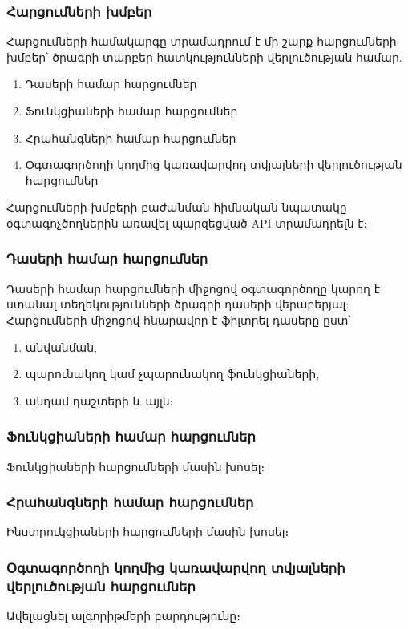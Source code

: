 {
    \subsubsection{Հարցումների խմբեր}\label{subsubsec:queryGroups}
    Հարցումների համակարգը տրամադրում է մի շարք հարցումների խմբեր՝ ծրագրի տարբեր հատկությունների վերլուծության համար.
    \begin{enumerate}
        \item Դասերի համար հարցումներ
        \item Ֆունկցիաների համար հարցումներ
        \item Հրահանգների համար հարցումներ
        \item Օգտագործողի կողմից կառավարվող տվյալների վերլուծության հարցումներ
    \end{enumerate}

    Հարցումների խմբերի բաժանման հիմնական նպատակը օգտագոչծողներին առավել պարզեցված API տրամադրելն է։

    \subsubsection*{Դասերի համար հարցումներ}\label{subsubsec:classes}
    Դասերի համար հարցումների միջոցով օգտագործողը կարող է ստանալ տեղեկությունների ծրագրի դասերի վերաբերյալ:
    Հարցումների միջոցով հնարավոր է ֆիլտրել դասերը ըստ՝
    \begin{enumerate}
        \item անվանման,
        \item պարունակող կամ չպարունակող ֆունկցիաների,
        \item անդամ դաշտերի և այլն։
    \end{enumerate}



    \subsubsection*{Ֆունկցիաների համար հարցումներ}\label{subsubsec:functions}
    Ֆունկցիաների հարցումների մասին խոսել։

    \subsubsection*{Հրահանգների համար հարցումներ}\label{subsubsec:instructions}
    Ինստրուկցիաների հարցումների մասին խոսել։

    \subsubsection*{Օգտագործողի կողմից կառավարվող տվյալների վերլուծության հարցումներ}\label{subsubsec:taintAnalisys}
    Ավելացնել ալգորիթմերի բարդությունը։
}